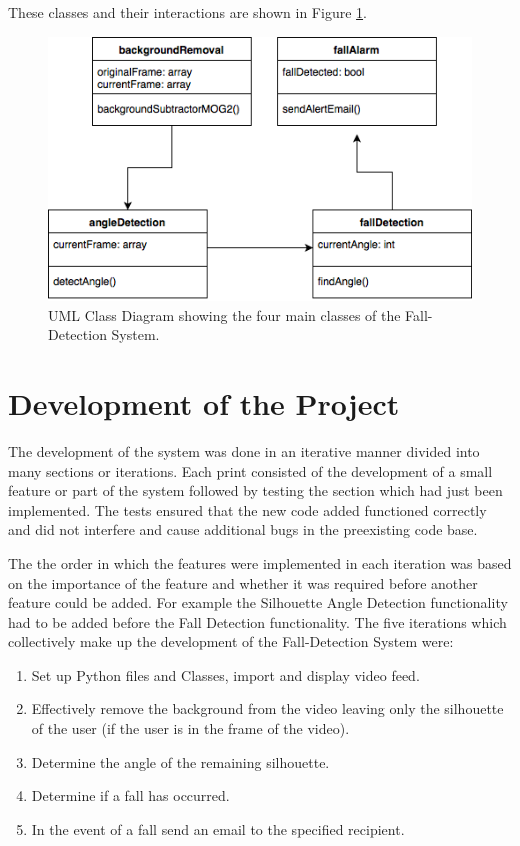 \documentclass[11pt,a4paper]{report}
\begin{document}
These classes and their interactions are shown in Figure \ref{fig:UMLClassDiagram}.

\begin{figure}[H]
 \centering
 \includegraphics[scale = 0.5]{UMLClassDiagram.png}
 \caption{UML Class Diagram showing the four main classes of the Fall-Detection System.}
 \label{fig:UMLClassDiagram}
\end{figure}

\pagebreak

\section{Development of the Project}

The development of the system was done in an iterative manner divided into many sections or iterations. Each print consisted of the development of a small feature or part of the system followed by testing the section which had just been implemented. The tests ensured that the new code added functioned correctly and did not interfere and cause additional bugs in the preexisting code base.

The the order in which the features were implemented in each iteration was based on the importance of the feature and whether it was required before another feature could be added. For example the Silhouette Angle Detection functionality had to be added before the Fall Detection functionality. The five iterations which collectively make up the development of the Fall-Detection System were:

\begin{enumerate}
\item Set up Python files and Classes, import and display video feed.
\item Effectively remove the background from the video leaving only the silhouette of the user (if the user is in the frame of the video).
\item Determine the angle of the remaining silhouette.
\item Determine if a fall has occurred.
\item In the event of a fall send an email to the specified recipient.
\end{enumerate}
\end{document}
